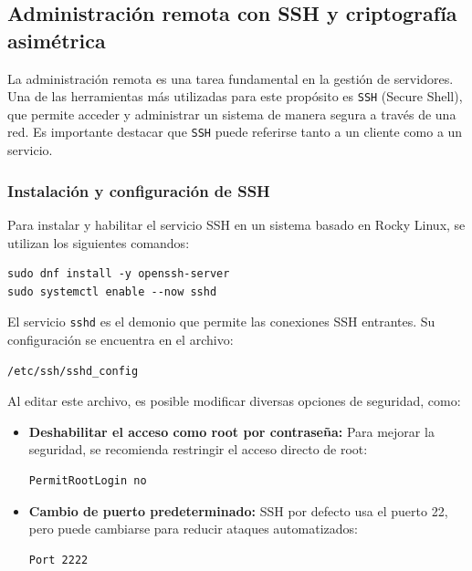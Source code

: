 \subsection{Administración remota con SSH y criptografía asimétrica}

La administración remota es una tarea fundamental en la gestión de servidores. Una de las herramientas más utilizadas para este propósito es \texttt{SSH} (Secure Shell), que permite acceder y administrar un sistema de manera segura a través de una red. Es importante destacar que \texttt{SSH} puede referirse tanto a un cliente como a un servicio.

\subsubsection{Instalación y configuración de SSH}
Para instalar y habilitar el servicio SSH en un sistema basado en Rocky Linux, se utilizan los siguientes comandos:

\begin{lstlisting}[style=mystyle]
sudo dnf install -y openssh-server
sudo systemctl enable --now sshd
\end{lstlisting}

El servicio \texttt{sshd} es el demonio que permite las conexiones SSH entrantes. Su configuración se encuentra en el archivo:

\begin{lstlisting}[style=mystyle]
/etc/ssh/sshd_config
\end{lstlisting}

Al editar este archivo, es posible modificar diversas opciones de seguridad, como:

\begin{itemize}
    \item \textbf{Deshabilitar el acceso como root por contraseña:} Para mejorar la seguridad, se recomienda restringir el acceso directo de root:
    \begin{lstlisting}[style=mystyle]
    PermitRootLogin no
    \end{lstlisting}
    
    \item \textbf{Cambio de puerto predeterminado:} SSH por defecto usa el puerto 22, pero puede cambiarse para reducir ataques automatizados:
    \begin{lstlisting}[style=mystyle]
    Port 2222
    \end{lstlisting}
\end{itemize}

